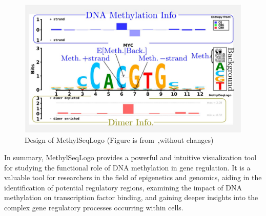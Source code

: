 \documentclass{PHlab-thesis}
\begin{document}
\begin{figure}[H]
	\centering
	\includegraphics[scale=1]{figures/F1.large.jpg}
	\caption{Design of MethylSeqLogo (Figure is from~\cite{Hsu2022.11.05.515271},without changes)}
	\label{fig:F1} %
\end{figure}

In summary, MethylSeqLogo provides a powerful and intuitive visualization tool for studying the functional role of DNA methylation in gene regulation. It is a valuable tool for researchers in the field of epigenetics and genomics, aiding in the identification of potential regulatory regions, examining the impact of DNA methylation on transcription factor binding, and gaining deeper insights into the complex gene regulatory processes occurring within cells.
\end{document}
